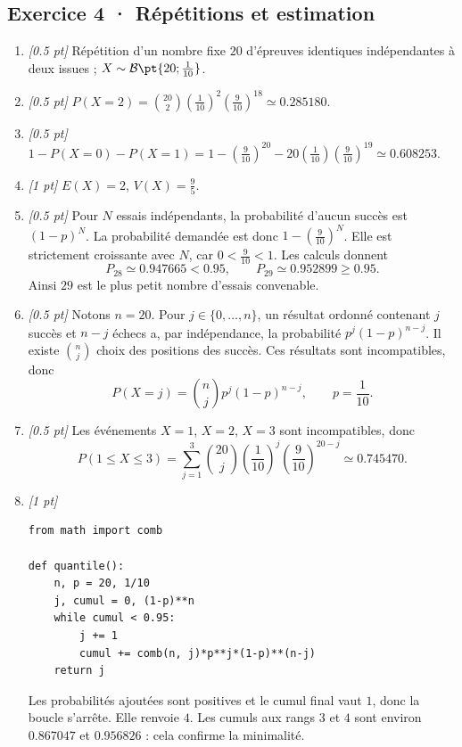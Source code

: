 \subsection*{Exercice 4 · Répétitions et estimation}\begin{enumerate}

\item \textit{[\num{0,5} pt]} Répétition d'un nombre fixe $20$ d'épreuves identiques indépendantes à deux issues ; $X\sim\mathcal B\pt{20;\frac{1}{10}}$.

\item \textit{[\num{0,5} pt]} $P(X=2)=\binom{20}2(\frac{1}{10})^2(\frac{9}{10})^{18}\simeq\num{0,285180}$.

\item \textit{[\num{0,5} pt]} $1-P(X=0)-P(X=1)=1-(\frac{9}{10})^{20}-20(\frac{1}{10})(\frac{9}{10})^{19}\simeq\num{0,608253}$.

\item \textit{[1 pt]} $E(X)=2$, $V(X)=\frac{9}{5}$.

\item \textit{[\num{0,5} pt]} Pour $N$ essais indépendants, la probabilité d'aucun succès est $(1-p)^N$. La probabilité demandée est donc $1-(\frac{9}{10})^N$. Elle est strictement croissante avec $N$, car $0<\frac{9}{10}<1$. Les calculs donnent
\[P_{28}\simeq\num{0,947665}<\num{0,95},\qquad P_{29}\simeq\num{0,952899}\ge\num{0,95}.\]
Ainsi $29$ est le plus petit nombre d'essais convenable.

\item \textit{[\num{0,5} pt]} Notons $n=20$. Pour $j\in\{0,\ldots,n\}$, un résultat ordonné contenant $j$ succès et $n-j$ échecs a, par indépendance, la probabilité $p^j(1-p)^{n-j}$. Il existe $\binom nj$ choix des positions des succès. Ces résultats sont incompatibles, donc
\[P(X=j)=\binom nj p^j(1-p)^{n-j},\qquad p=\frac{1}{10}.\]

\item \textit{[\num{0,5} pt]} Les événements $X=1$, $X=2$, $X=3$ sont incompatibles, donc
\[P(1\le X\le3)=\sum_{j=1}^3\binom{20}j(\frac{1}{10})^j(\frac{9}{10})^{20-j}\simeq\num{0,745470}.\]


\item \textit{[1 pt]} 
\begin{lstlisting}
from math import comb

def quantile():
    n, p = 20, 1/10
    j, cumul = 0, (1-p)**n
    while cumul < 0.95:
        j += 1
        cumul += comb(n, j)*p**j*(1-p)**(n-j)
    return j
\end{lstlisting}
Les probabilités ajoutées sont positives et le cumul final vaut $1$, donc la boucle s'arrête. Elle renvoie $4$. Les cumuls aux rangs $3$ et $4$ sont environ $\num{0,867047}$ et $\num{0,956826}$ : cela confirme la minimalité.

\end{enumerate}

\fi

\fi

